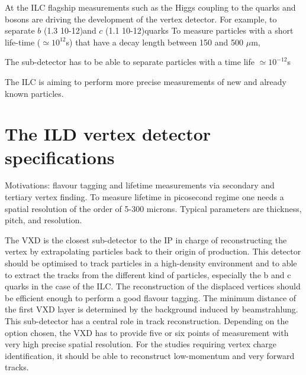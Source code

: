   At the \gls{ILC} flagship measurements such as the Higgs coupling to the quarks and bosons are driving the development of the vertex detector.
  For example, to separate $b$ (1.3 10-12)and $c$ (1.1 10-12)quarks
  To measure particles with a short life-time ($\simeq 10^{12}$s) that have a decay length between 150 and 500 $\mu$m, 


  The sub-detector has to be able to separate particles with a time life $\simeq 10^{-12}$s  


  The \gls{ILC} is aiming to perform more precise measurements of new and already known particles. 

  \minitoc
  
  \section{The ILD vertex detector specifications}
   





    Motivations: flavour tagging and lifetime measurements via secondary and tertiary vertex finding. 
    To measure lifetime in picosecond regime one needs a spatial resolution of the order of 5-300 microns.
    Typical parameters are thickness, pitch, and resolution.
    

    The \gls{VXD} is the closest sub-detector to the \gls{IP} in charge of reconstructing the vertex by extrapolating particles back to their origin of production. 
    This detector should be optimised to track particles in a high-density environment and to able to extract the tracks from the different kind of particles, especially the b and c quarks in the case of the \gls{ILC}.
    The reconstruction of the displaced vertices should be efficient enough to perform a good flavour tagging.
    The minimum distance of the first \gls{VXD} layer is determined by the background induced by beamstrahlung.
    This sub-detector has a central role in track reconstruction.
    Depending on the option chosen, the \gls{VXD} has to provide five or six points of measurement with very high precise spatial resolution.
    For the studies requiring vertex charge identification, it should be able to reconstruct low-momentum and very forward tracks.
   

